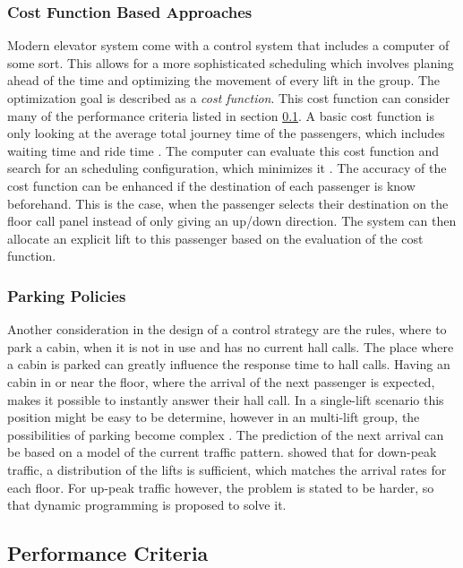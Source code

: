 \subsubsection{Cost Function Based Approaches}
Modern elevator system come with a control system that includes a computer of some sort.
This allows for a more sophisticated scheduling which involves planing ahead of the time and optimizing the movement of every lift in the group.
\autocite[][pp.261ff]{barney2016handbook}
The optimization goal is described as a \emph{cost function}.
This cost function can consider many of the performance criteria listed in section \ref{sec:sota:perf}.
A basic cost function is only looking at the average total journey time of the passengers, which includes waiting time and ride time
\autocite[][pp.278ff]{barney2016handbook}.
The computer can evaluate this cost function and search for an scheduling configuration, which minimizes it 
\autocite[][pp.~3--6]{axelsson2013strategies}.
The accuracy of the cost function can be enhanced if 
the destination of each passenger is know beforehand.
This is the case, when the passenger selects their destination on the floor call panel instead of only giving an up/down direction.
The system can then allocate an explicit lift to this passenger based on the evaluation of the cost function.

\subsubsection{Parking Policies}
Another consideration in the design of a control strategy are the rules, where to park a cabin, when it is not in use and has no current hall calls.
The place where a cabin is parked can greatly influence the response time to hall calls.
Having an cabin in or near the floor, where the arrival of the next passenger is expected, 
makes it possible to instantly answer their hall call.
In a single-lift scenario this position might be easy to be determine, 
however in an multi-lift group, the possibilities of parking become complex \autocite[][pp.~3]{beers2015arrivals}.
The prediction of the next arrival can be based on a model of the current traffic pattern.
\textcite{brand2004parking} showed that for down-peak traffic, a distribution of the lifts is sufficient, which matches the arrival rates for each floor.
For up-peak traffic however, the problem is stated to be harder, 
so that dynamic programming is proposed to solve it.


\subsection{Performance Criteria}
\label{sec:sota:perf}


